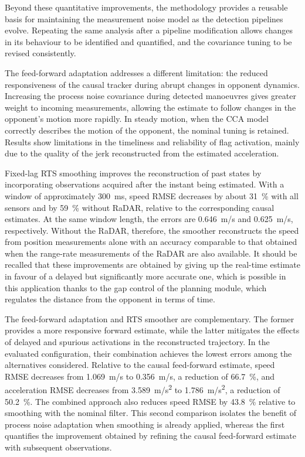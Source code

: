 Beyond these quantitative improvements, the methodology provides a reusable basis for maintaining the measurement noise model as the detection pipelines evolve. Repeating the same analysis after a pipeline modification allows changes in its behaviour to be identified and quantified, and the covariance tuning to be revised consistently.

The feed-forward adaptation addresses a different limitation: the reduced responsiveness of the causal tracker during abrupt changes in opponent dynamics. Increasing the process noise covariance during detected manoeuvres gives greater weight to incoming measurements, allowing the estimate to follow changes in the opponent's motion more rapidly. In steady motion, when the CCA model correctly describes the motion of the opponent, the nominal tuning is retained. Results show limitations in the timeliness and reliability of flag activation, mainly due to the quality of the jerk reconstructed from the estimated acceleration.

Fixed-lag RTS smoothing improves the reconstruction of past states by incorporating observations acquired after the instant being estimated. With a window of approximately \SI{300}{ms}, speed RMSE decreases by about \SI{31}{\percent} with all sensors and by \SI{59}{\percent} without RaDAR, relative to the corresponding causal estimates. At the same window length, the errors are \SI{0.646}{m/s} and \SI{0.625}{m/s}, respectively. Without the RaDAR, therefore, the smoother reconstructs the speed from position measurements alone with an accuracy comparable to that obtained when the range-rate measurements of the RaDAR are also available. It should be recalled that these improvements are obtained by giving up the real-time estimate in favour of a delayed but significantly more accurate one, which is possible in this application thanks to the gap control of the planning module, which regulates the distance from the opponent in terms of time.

The feed-forward adaptation and RTS smoother are complementary. The former provides a more responsive forward estimate, while the latter mitigates the effects of delayed and spurious activations in the reconstructed trajectory. In the evaluated configuration, their combination achieves the lowest errors among the alternatives considered. Relative to the causal feed-forward estimate, speed RMSE decreases from \SI{1.069}{m/s} to \SI{0.356}{m/s}, a reduction of \SI{66.7}{\percent}, and acceleration RMSE decreases from \SI{3.589}{m/s^2} to \SI{1.786}{m/s^2}, a reduction of \SI{50.2}{\percent}. The combined approach also reduces speed RMSE by \SI{43.8}{\percent} relative to smoothing with the nominal filter. This second comparison isolates the benefit of process noise adaptation when smoothing is already applied, whereas the first quantifies the improvement obtained by refining the causal feed-forward estimate with subsequent observations.


